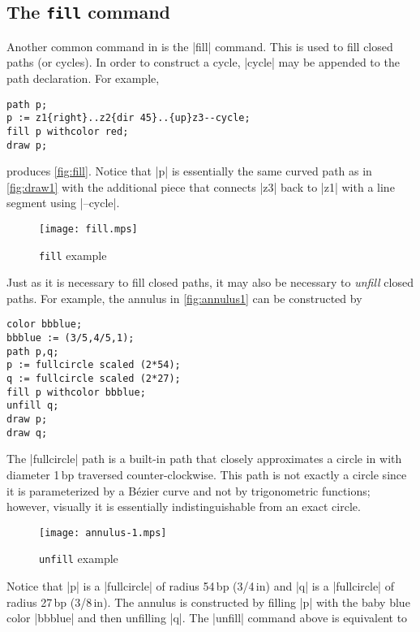 \subsection{The \texttt{fill} command}

Another common command in \MP{} is the |fill| command.  This is used to
fill closed paths (or cycles).  In order to construct a cycle, |cycle|
may be appended to the path declaration.  For example,

\begin{lstlisting}[style=MP]
path p;
p := z1{right}..z2{dir 45}..{up}z3--cycle;
fill p withcolor red;
draw p;
\end{lstlisting}
produces \autoref{fig:fill}.  Notice that |p| is essentially the same
curved path as in \autoref{fig:draw1} with the additional piece that
connects |z3| back to |z1| with a line segment using |--cycle|.

\begin{figure}
  \centering
  \texttt{[image: fill.mps]}
  \caption{\texttt{fill} example}
  \label{fig:fill}
\end{figure}

Just as it is necessary to fill closed paths, it may also be necessary
to \textit{unfill} closed paths.  For example, the annulus in
\autoref{fig:annulus1} can be constructed by

\begin{lstlisting}[style=MP]
color bbblue;
bbblue := (3/5,4/5,1);
path p,q;
p := fullcircle scaled (2*54);
q := fullcircle scaled (2*27);
fill p withcolor bbblue;
unfill q;
draw p;
draw q;
\end{lstlisting}

The |fullcircle| path is a built-in path that closely
approximates a circle in \MP{} with diameter 1\,bp traversed
counter-clockwise.  This path is not exactly a circle since it is
parameterized by a B\'{e}zier curve and not by trigonometric functions;
however, visually it is essentially indistinguishable from an exact
circle.

\begin{figure}
  \centering
  \texttt{[image: annulus-1.mps]}
  \caption{\texttt{unfill} example}
  \label{fig:annulus1}
\end{figure}

Notice that |p| is a |fullcircle| of radius 54\,bp (3/4\,in) and |q| is
a |fullcircle| of radius 27\,bp (3/8\,in).  The annulus is constructed
by filling |p| with the baby blue color |bbblue| and then unfilling |q|.
The |unfill| command above is equivalent to


